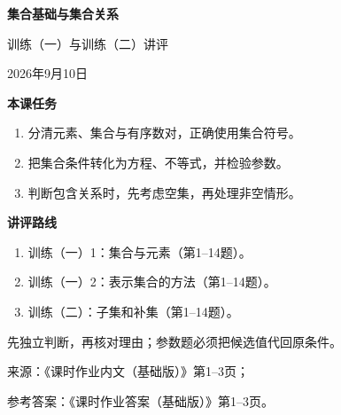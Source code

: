 \documentclass[UTF8,10pt,aspectratio=169]{ctexbeamer}
\newcommand{\LessonTitle}{集合基础与集合关系}
\newcommand{\LessonSubtitle}{训练（一）与训练（二）讲评}
\newcommand{\LessonInfo}{2026年9月10日}
\newcommand{\PageHeading}[1]{\begin{center}{\Large\bfseries #1}\end{center}\vspace{0.2cm}}
\begin{document}
\begin{frame}
\begin{center}
{\Large\bfseries \LessonTitle}\par\vspace{0.5cm}
{\large \LessonSubtitle}\par\vspace{0.3cm}\LessonInfo
\end{center}
\vspace{0.4cm}
\textbf{本课任务}
\begin{enumerate}
\item 分清元素、集合与有序数对，正确使用集合符号。
\item 把集合条件转化为方程、不等式，并检验参数。
\item 判断包含关系时，先考虑空集，再处理非空情形。
\end{enumerate}
\end{frame}
\begin{frame}
\PageHeading{讲评路线}
\begin{enumerate}
\item 训练（一）1：集合与元素（第1--14题）。
\item 训练（一）2：表示集合的方法（第1--14题）。
\item 训练（二）：子集和补集（第1--14题）。
\end{enumerate}
\vspace{0.3cm}
先独立判断，再核对理由；参数题必须把候选值代回原条件。
\par\vspace{0.3cm}
{\small 来源：《课时作业内文（基础版）》第1--3页；\par
参考答案：《课时作业答案（基础版）》第1--3页。}
\end{frame}
\end{document}

